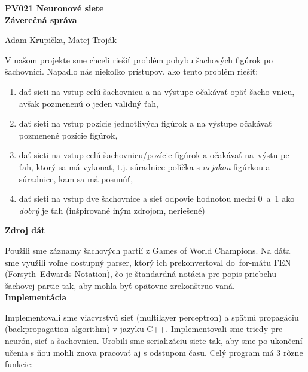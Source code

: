 \documentclass[12pt]{article}
\newcommand{\mysection}[1]{{\newpage\centering\Large\textbf{#1}\\}\normalsize\vspace{0.1cm}}
\newcommand{\mysmallsection}[1]{\vspace{0.5cm}{\centering\large\textbf{#1}\\}\normalsize\vspace{0.5cm}}
\begin{document}
\mysection{PV021 Neuronové siete \\ Záverečná správa}
\begin{center}
Adam Krupička, Matej Troják
\end{center}

\mysmallsection{Problém šachového ťahu}
V našom projekte sme chceli riešiť problém pohybu šachových figúrok po šachovnici. Napadlo nás niekoľko prístupov, ako tento problém riešiť:

\begin{enumerate}
\item dať sieti na vstup celú šachovnicu a na výstupe očakávať opäť šacho-vnicu, avšak pozmenenú o jeden validný ťah,
\item dať sieti na vstup pozície jednotlivých figúrok a na výstupe očakávať pozmenené pozície figúrok,
\item dať sieti na vstup celú šachovnicu/pozície figúrok a očakávať na~výstu-pe ťah, ktorý sa má vykonať, t.j. súradnice políčka s \textit{nejakou} figúrkou a súradnice, kam sa má posunúť,
\item dať sieti na vstup dve šachovnice a sieť odpovie hodnotou medzi 0~a~1 ako \textit{dobrý} je ťah (inšpirované iným zdrojom, neriešené)
\end{enumerate}

{\centering\textbf{Zdroj dát}\\}

Použili sme záznamy šachových partií z Games of World Champions\footnotemark[1]. Na dáta sme využili voľne dostupný parser, ktorý ich prekonvertoval do~for-mátu FEN (Forsyth–Edwards Notation), čo je štandardná notácia pre popis priebehu šachovej partie tak, aby mohla byť opätovne zrekonštruo-vaná. \\

{\centering\textbf{Implementácia}\\}

Implementovali sme viacvrstvú sieť (multilayer perceptron) a spätnú propagáciu (backpropagation algorithm) v jazyku C++. Implementovali sme triedy pre neurón, sieť a šachovnicu. Urobili sme serializáciu siete tak, aby sme po ukončení učenia s ňou mohli znova pracovať aj s odstupom času. Celý program má 3 rôzne funkcie:
\end{document}
